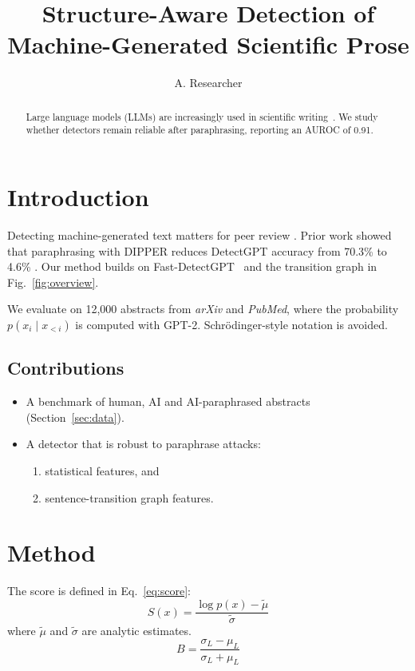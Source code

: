 \documentclass{article}
\title{Structure-Aware Detection of Machine-Generated Scientific Prose}
\author{A. Researcher}
\begin{document}
\maketitle

\begin{abstract}
Large language models (LLMs) are increasingly used in scientific writing~\cite{kobak2024}.
We study whether detectors remain reliable after paraphrasing, reporting an AUROC of 0.91.
\end{abstract}

\section{Introduction}
Detecting machine-generated text matters for peer review \citep{liang2024,krishna2023}.
Prior work showed that paraphrasing with DIPPER reduces DetectGPT accuracy from 70.3\% to 4.6\%
\citep[see][p.~4]{krishna2023}. %
Our method builds on Fast-DetectGPT~\cite{bao2024} and the transition graph in Fig.~\ref{fig:overview}.

We evaluate on 12,000 abstracts from \textit{arXiv} and \emph{PubMed}, where the
probability $p(x_i \mid x_{<i})$ is computed with GPT-2. Schr\"odinger-style notation is avoided.

\subsection{Contributions}
\begin{itemize}
  \item A benchmark of human, AI and AI-paraphrased abstracts (Section~\ref{sec:data}).
  \item A detector that is robust to paraphrase attacks:
  \begin{enumerate}
    \item statistical features, and
    \item sentence-transition graph features.
  \end{enumerate}
\end{itemize}

\section{Method}\label{sec:method}
The score is defined in Eq.~\eqref{eq:score}:
\begin{equation}
  S(x) = \frac{\log p(x) - \tilde{\mu}}{\tilde{\sigma}} \label{eq:score}
\end{equation}
where $\tilde{\mu}$ and $\tilde{\sigma}$ are analytic estimates.
\[ B = \frac{\sigma_L - \mu_L}{\sigma_L + \mu_L} \]
\end{document}
